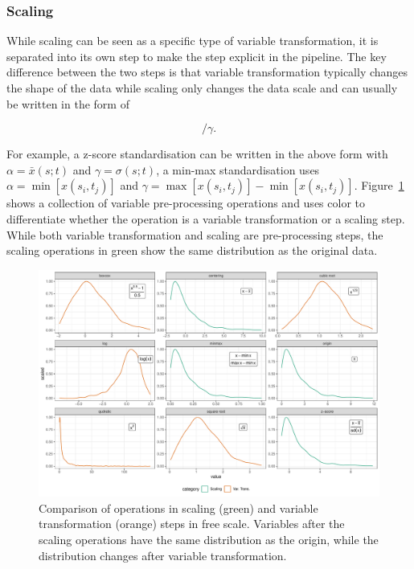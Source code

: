 \documentclass[
]{interact}
\begin{document}
\hypertarget{scaling}{%
\subsubsection{Scaling}\label{scaling}}

While scaling can be seen as a specific type of variable transformation,
it is separated into its own step to make the step explicit in the
pipeline. The key difference between the two steps is that variable
transformation typically changes the shape of the data while scaling
only changes the data scale and can usually be written in the form of

\begin{equation}
[x(s_i;t_j) - \alpha]/\gamma.
\end{equation}

For example, a z-score standardisation can be written in the above form
with \(\alpha = \bar{x}(s; t)\) and \(\gamma = \sigma(s; t)\), a min-max
standardisation uses \(\alpha = \min[x(s_i, t_j)]\) and
\(\gamma = \max[x(s_i, t_j)] - \min[x(s_i, t_j)]\).
Figure~\ref{fig-scale-var-trans-compare} shows a collection of variable
pre-processing operations and uses color to differentiate whether the
operation is a variable transformation or a scaling step. While both
variable transformation and scaling are pre-processing steps, the
scaling operations in green show the same distribution as the original
data.

\begin{figure}

{\centering \includegraphics{tidyindex_files/figure-pdf/fig-scale-var-trans-compare-1.pdf}

}

\caption{\label{fig-scale-var-trans-compare}Comparison of operations in
scaling (green) and variable transformation (orange) steps in free
scale. Variables after the scaling operations have the same distribution
as the origin, while the distribution changes after variable
transformation.}

\end{figure}
\end{document}
